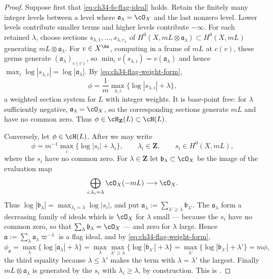 \begin{proof}
Suppose first that \eqref{eq:ch34-fs-flag-ideal} holds.
Retain the finitely many integer levels between a level where
$\mathfrak a_\lambda=\cO_X$ and the last nonzero level.
Lower levels contribute smaller terms and higher levels contribute
$-\infty$.  For each retained $\lambda$, choose sections $s_{\lambda,1},\ldots,s_{\lambda,r_\lambda}$
of $H^0(X,mL\otimes\mathfrak a_\lambda)\subset H^0(X,mL)$ generating
$mL\otimes\mathfrak a_\lambda$.  For $v\in X^{\An}$, computing in a
frame of $mL$ at $c(v)$, these germs generate
$(\mathfrak a_\lambda)_{c(v)}$, so
$\min_iv(s_{\lambda,i})=v(\mathfrak a_\lambda)$ and hence
$\max_i\log|s_{\lambda,i}|=\log|\mathfrak a_\lambda|$.  By
\eqref{eq:ch34-flag-weight-form},
\[
 \phi=\frac1m\max_{\lambda,i}\{\log|s_{\lambda,i}|+\lambda\},
\]
a weighted section system for $L$ with integer weights.  It is base-point
free: for $\lambda$ sufficiently negative, $\mathfrak a_\lambda=\cO_X$, so the
corresponding sections generate $mL$ and have no common zero.  Thus
$\phi\in\cH_{\mathbf Z}(L)\subset\cH(L)$.

Conversely, let $\phi\in\cH(L)$.  After  we may
write
\[
 \phi=m^{-1}\max_i\{\log|s_i|+\lambda_i\},
 \qquad \lambda_i\in\mathbf Z,
 \qquad s_i\in H^0(X,mL),
\]
where the $s_i$ have no common zero.  For
$\lambda\in\mathbf Z$ let $\mathfrak b_\lambda\subset\cO_X$ be the image
of the evaluation map
\[
 \bigoplus_{i:\lambda_i=\lambda}\cO_X(-mL)\longrightarrow\cO_X.
\]
Thus
$\log|\mathfrak b_\lambda|=\max_{\lambda_i=\lambda}\log|s_i|$, and put
$\mathfrak a_\lambda:=\sum_{\lambda'\ge\lambda}\mathfrak b_{\lambda'}$.
The $\mathfrak a_\lambda$ form a decreasing family of ideals which is
$\cO_X$ for $\lambda$ small --- because the $s_i$ have no common zero,
so that $\sum_\lambda\mathfrak b_\lambda=\cO_X$ --- and zero for
$\lambda$ large.  Hence
$\mathfrak a:=\sum_\lambda\mathfrak a_\lambda\varpi^{-\lambda}$ is a flag
ideal, and by \eqref{eq:ch34-flag-weight-form},
\[
 \phi_{\mathfrak a}
 =\max_\lambda\{\log|\mathfrak a_\lambda|+\lambda\}
 =\max_\lambda\max_{\lambda'\ge\lambda}
     \{\log|\mathfrak b_{\lambda'}|+\lambda\}
 =\max_{\lambda'}\{\log|\mathfrak b_{\lambda'}|+\lambda'\}
 =m\phi,
\]
the third equality because $\lambda\le\lambda'$ makes the term with
$\lambda=\lambda'$ the largest.  Finally
$mL\otimes\mathfrak a_\lambda$ is generated by the $s_i$ with
$\lambda_i\ge\lambda$, by construction.  This is
\cite[Proposition~2.25]{BJ22}.
\end{proof}

